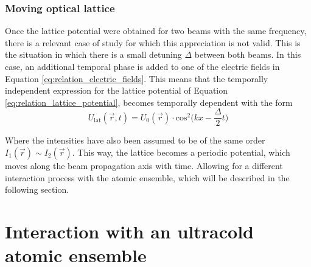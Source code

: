 \subsubsection{Moving optical lattice}

Once the lattice potential were obtained for two beams with the same frequency, there is a relevant case of study for which this appreciation is not valid. This is the situation in which there is a small detuning $\Delta$ between both beams. In this case, an additional temporal phase is added to one of the electric fields in Equation \eqref{eq:relation_electric_fields}. This means that the temporally independent expression for the lattice potential of Equation \eqref{eq:relation_lattice_potential}, becomes temporally dependent with the form
\begin{equation}\label{eq:relation_moving_lattice_potential}
	U_{\text{lat}}(\vec{r},t) = U_{0}(\vec{r}) \cdot \text{cos}^2\bigg(kx-\frac{\Delta}{2}t\bigg)
\end{equation} 

Where the intensities have also been assumed to be of the same order $I_{1}(\vec{r}) \sim I_{2}(\vec{r})$. This way, the lattice becomes a periodic potential, which moves along the beam propagation axis with time. Allowing for a different interaction process with the atomic ensemble, which will be described in the following section.


\section{Interaction with an ultracold atomic ensemble}



